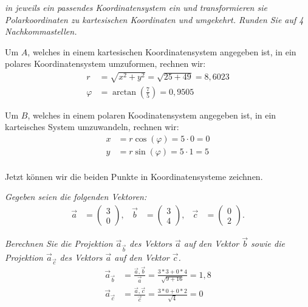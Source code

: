 \documentclass[
  ngerman,
  DIV=14
]{scrartcl}
\begin{document}
\emph{in jeweils ein passendes Koordinatensystem ein und transformieren sie Polarkoordinaten zu kartesischen Koordinaten und umgekehrt. Runden Sie auf 4 Nachkommastellen.}


Um $A$, welches in einem kartesischen Koordinatensystem angegeben ist, in ein polares Koordinatensystem umzuformen, rechnen wir:
\begin{align*}
  r &= \sqrt{x^2 + y^2} = \sqrt{25 + 49} = 8,6023\\
  \varphi &= \arctan(\frac{7}{5}) = 0,9505
\end{align*}

Um $B$, welches in einem polaren Koodinatensystem angegeben ist, in ein karteisches System umzuwandeln, rechnen wir:
\begin{align*}
  x &= r \cos(\varphi) = 5 \cdot 0 = 0\\
  y &= r \sin(\varphi) = 5 \cdot 1 = 5\\
\end{align*}

Jetzt können wir die beiden Punkte in Koordinatensysteme zeichnen.




\emph{Gegeben seien die folgenden Vektoren:}
\begin{align*}
\vec{a} &= \begin{pmatrix}3\\0\end{pmatrix}, & \vec{b} &= \begin{pmatrix}3\\4\end{pmatrix}, & \vec{c} &= \begin{pmatrix}0\\2\end{pmatrix}.
\end{align*}


\emph{Berechnen Sie die Projektion $\vec{a}_{\vec{b}}$ des Vektors $\vec{a}$ auf den Vektor $\vec{b}$ sowie die Projektion $\vec{a}_{\vec{c}}$ des Vektors $\vec{a}$ auf den Vektor $\vec{c}$.}
\begin{align*}
\vec{a}_{\vec{b}} &= \frac{\vec{a}, \vec{b}}{\vec{a}} = \frac{3*3+0*4}{\sqrt{9+16}}=1,8\\
\vec{a}_{\vec{c}} &= \frac{\vec{a}, \vec{c}}{\vec{c}}=\frac{3 * 0 + 0 * 2}{\sqrt{4}} = 0
\end{align*}
\end{document}
